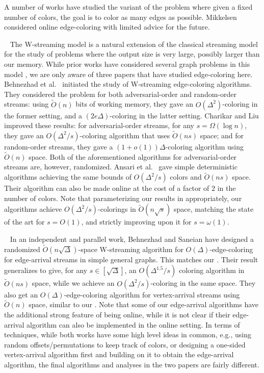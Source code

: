 \documentclass[10pt]{article}
\theoremstyle{definition}\newtheorem{definition}[lemma]{Definition}
\theoremstyle{remark}  \newtheorem*{remark}{Remark}
\newcommand{\tO}{\widetilde{O}}
\newcommand{\mypar}[1]{\medskip\noindent{\bfseries #1.}~}
\begin{document}
A number of works \cite{FavrholdtN03, EhmsenFKM10, FavrholdtM18} have studied the variant of the problem where given a fixed number of colors, the goal is to color as many edges as possible. Mikkelsen \cite{Mikkelsen15, Mikkelsen16} considered online edge-coloring with limited advice for the future.

\mypar{W-Streaming model} The W-streaming model \cite{DemetrescuFR06} is a natural extension of the classical streaming model for the study of problems where the output size is very large, possibly larger than our memory. While prior works have considered several graph problems in this model \cite{DemetrescuFR06, DemetrescuEMR10, LauraS11, GlazikSS22}, we are only aware of three papers \cite{BehnezhadDHKS19, CharikarL21, AnsariSZ22} that have studied edge-coloring here. Behnezhad et al.~\cite{BehnezhadDHKS19} initiated the study of W-streaming edge-coloring algorithms. They considered the problem for both adversarial-order and random-order streams: using $\tO(n)$ bits of working memory, they gave an $O(\Delta^2)$-coloring in the former setting, and a $(2e\Delta)$-coloring in the latter setting. Charikar and Liu \cite{CharikarL21} improved these results: for adversarial-order streams, for any $s=\Omega(\log n)$, they gave an $O(\Delta^2/s)$-coloring algorithm that uses $\tO(ns)$ space; and for random-order streams, they gave a $(1+o(1))\Delta$-coloring algorithm using $\tO(n)$ space. Both of the aforementioned algorithms for adversarial-order streams are, however, randomized. Ansari et al.~\cite{AnsariSZ22} gave simple deterministic algorithms achieving the same bounds of $O(\Delta^2/s)$ colors and $\tO(ns)$ space. Their algorithm can also be made online at the cost of a factor of $2$ in the number of colors. Note that parameterizing our results in  appropriately, our algorithms achieve $O(\Delta^2/s)$-colorings in $\tO(n\sqrt{s})$ space, matching the state of the art for $s=O(1)$, and strictly improving upon it for $s=\omega(1)$.    


\mypar{Concurrent work} In an independent and parallel work, Behnezhad and Saneian \cite{BehnezhadS23} have designed a randomized $\tO(n\sqrt{\Delta})$-space W-streaming algorithm for $O(\Delta)$-edge-coloring for edge-arrival streams in simple general graphs. This matches our . Their result generalizes to give, for any $s \in [\sqrt{\Delta}]$, an $O(\Delta^{1.5} / s)$ coloring algorithm in $\tO(n s)$ space, while we achieve an $O(\Delta^2 / s)$-coloring in the same space. They also get an $O(\Delta)$-edge-coloring algorithm for vertex-arrival streams using $\tO(n)$ space, similar to our . Note that some of our edge-arrival algorithms have the additional strong feature of being online, while it is not clear if their edge-arrival algorithm can also be implemented in the online setting. 
In terms of techniques, while both works have some high level ideas in common, e.g., using random offsets/permutations to keep track of colors, or designing a one-sided vertex-arrival algorithm first and building on it to obtain the edge-arrival algorithm, the final algorithms and analyses in the two papers are fairly different.
\end{document}
